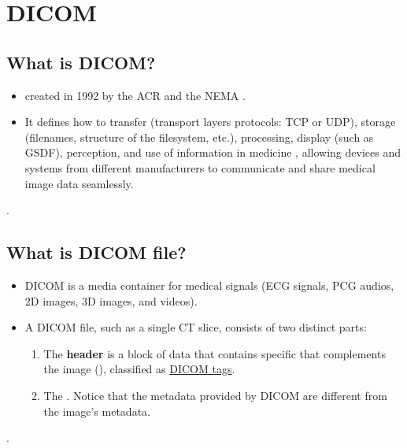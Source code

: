 \chapter{\gls{DICOM}}

\section{What is DICOM?}
\begin{itemize}
\item {}
   created in 1992 by
  the \gls{ACR} and the \gls{NEMA} \cite{DICOM2025}.
\item It defines how to transfer (transport layers protocols:
  \gls{TCP} or \gls{UDP}), storage (filenames, structure of the
  filesystem, etc.), processing, display (such as \gls{GSDF}),
  perception, and use of information in medicine
  \cite{bushberg2011essential}, allowing devices and systems from
  different manufacturers to communicate and share medical image data
  seamlessly.
\end{itemize}.

\section{What is DICOM file?}
\begin{itemize}
\item \gls{DICOM} is a media container for medical signals
  (\gls{ECG} signals, \gls{PCG} audios, 2D images, 3D images, and videos).
\item A DICOM file, such as a single CT slice, consists of two
  distinct parts:
  \begin{enumerate}
  \item The \textbf{header} is a block of data that contains specific
      that complements the image
    (), classified as
    \href{https://dicom.nema.org/medical/dicom/current/output/html/part06.html#PS3.6}{DICOM
      tags}.
  \item The . Notice that the metadata provided by \gls{DICOM} are
    different from the image's metadata.
  \end{enumerate}
\end{itemize}.

